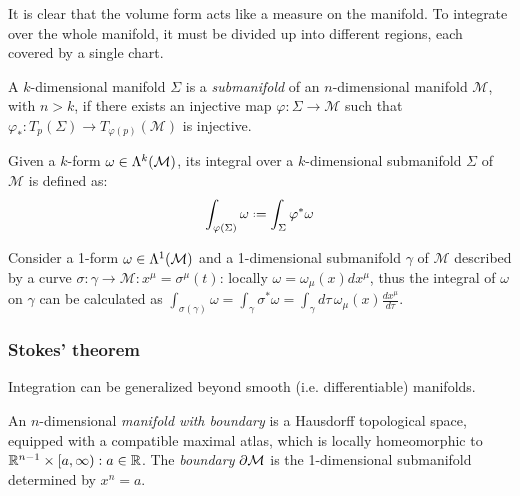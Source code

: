 It is clear that the volume form acts like a measure on the manifold. To integrate over the whole manifold, it must be divided up into different regions, each covered by a single chart.

\begin{definition}
  A $ k $-dimensional manifold $ \Sigma $ is a \textit{submanifold} of an $ n $-dimensional manifold $ \mathcal{M} $, with $ n > k $, if there exists an injective map $ \varphi : \Sigma \rightarrow \mathcal{M} $ such that $ \varphi_* : T_p(\Sigma) \rightarrow T_{\varphi(p)}(\mathcal{M}) $ is injective.
\end{definition}

\begin{definition}
  Given a $ k $-form $ \omega \in\Lambda^{k}(\mathcal{M}) $, its integral over a $ k $-dimensional submanifold $ \Sigma $ of $ \mathcal{M} $ is defined as:
  \begin{equation}
    \int_{\varphi(\Sigma)} \omega \defeq \int_{\Sigma} \varphi^* \omega
    \label{eq:2.47}
  \end{equation}
\end{definition}

\begin{example}
  Consider a 1-form $ \omega \in\Lambda^{1}(\mathcal{M}) $ and a 1-dimensional submanifold $ \gamma $ of $ \mathcal{M} $ described by a curve $ \sigma : \gamma \rightarrow \mathcal{M}: x^{\mu} = \sigma^{\mu}(t) $: locally $ \omega = \omega_{\mu}(x) dx^{\mu} $, thus the integral of $ \omega $ on $ \gamma $ can be calculated as $ \int_{\sigma(\gamma)} \omega = \int_{\gamma} \sigma^* \omega = \int_{\gamma} d\tau \,\omega_{\mu}(x) \frac{dx^{\mu}}{d\tau} $.
\end{example}

\subsubsection{Stokes' theorem}

Integration can be generalized beyond smooth (i.e. differentiable) manifolds.

\begin{definition}
  An $ n $-dimensional \textit{manifold with boundary} is a Hausdorff topological space, equipped with a compatible maximal atlas, which is locally homeomorphic to $ \mathbb{R}^{n-1} \times [a,\infty) : a \in\mathbb{R} $.
  The \textit{boundary} $ \partial \mathcal{M} $ is the 1-dimensional submanifold determined by $ x^n = a $.
\end{definition}

